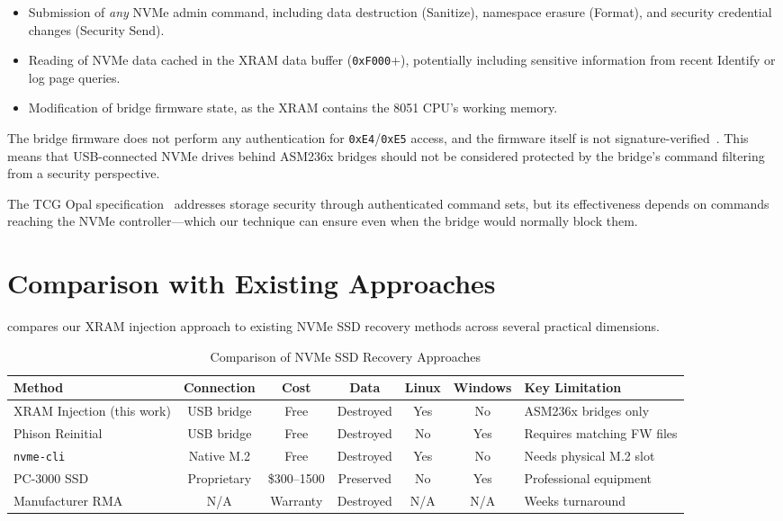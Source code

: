 \documentclass[conference]{IEEEtran}
\begin{document}
\begin{itemize}
\item Submission of \emph{any} NVMe admin command, including data
  destruction (Sanitize), namespace erasure (Format), and security
  credential changes (Security Send).
\item Reading of NVMe data cached in the XRAM data buffer
  (\texttt{0xF000}+), potentially including sensitive information from
  recent Identify or log page queries.
\item Modification of bridge firmware state, as the XRAM contains the
  8051 CPU's working memory.
\end{itemize}

The bridge firmware does not perform any authentication for
\texttt{0xE4}/\texttt{0xE5} access, and the firmware itself is not
signature-verified~\cite{cyrozap-usb-pcie}. This means that
USB-connected NVMe drives behind ASM236x bridges should not be
considered protected by the bridge's command filtering from a security
perspective.

The TCG Opal specification~\cite{tcg-opal-nvme} addresses storage
security through authenticated command sets, but its effectiveness
depends on commands reaching the NVMe controller---which our technique
can ensure even when the bridge would normally block them.


\section{Comparison with Existing Approaches}
\label{sec:comparison}

 compares our XRAM injection approach to existing
NVMe SSD recovery methods across several practical dimensions.

\begin{table}[t]
\centering
\caption{Comparison of NVMe SSD Recovery Approaches}
\label{tab:comparison}
\begin{tabular}{@{}lcccccl@{}}
\toprule
Method & Connection & Cost & Data & Linux & Windows & Key Limitation \\
\midrule
XRAM Injection (this work) & USB bridge & Free & Destroyed & Yes & No &
  ASM236x bridges only \\
Phison Reinitial~\cite{phison-reinitial} & USB bridge & Free & Destroyed
  & No & Yes & Requires matching FW files \\
\texttt{nvme-cli}~\cite{nvme-cli} & Native M.2 & Free & Destroyed &
  Yes & No & Needs physical M.2 slot \\
PC-3000 SSD~\cite{acelab-phison} & Proprietary & \$300--1500 &
  Preserved & No & Yes & Professional equipment \\
Manufacturer RMA & N/A & Warranty & Destroyed & N/A & N/A &
  Weeks turnaround \\
\bottomrule
\end{tabular}
\end{table}
\end{document}
